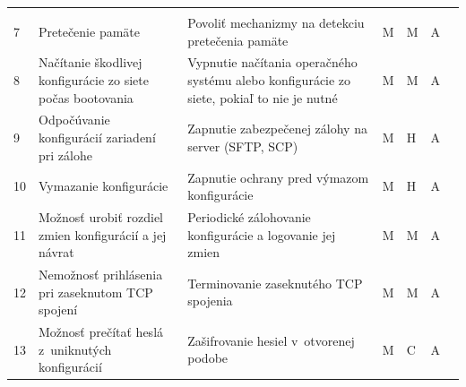 \begin{longtable}[!htbp]{|C{2.5em}L{11em}L{11em}C{2.5em}C{4em}C{5em}L{2.5em}|}
	\cite{CIS_DrTLsgXv24lxeIIM}\\
	 7	&Pretečenie pamäte	&Povoliť mechanizmy na detekciu pretečenia pamäte	&M	&M	&A	& \cite{Singh2018}\\
	8	&Načítanie škodlivej konfigurácie zo siete počas bootovania	&Vypnutie načítania operačného systému alebo konfigurácie zo siete, pokiaľ to nie je nutné	&M	&M	&A	& \cite{Akin2002}\\
	 9	&Odpočúvanie konfigurácií zariadení pri zálohe	&Zapnutie zabezpečenej zálohy na server (SFTP, SCP)	&M	&H	&A	& \cite{Singh2018}\\
	10	&Vymazanie konfigurácie	&Zapnutie ochrany pred výmazom konfigurácie	&M	&H	&A	& \cite{McMillan2018}\\
	 11	&Možnosť urobiť rozdiel zmien konfigurácií a jej návrat	&Periodické zálohovanie konfigurácie a logovanie jej zmien	&M	&M	&A	& \cite{McMillan2018}
	
	\cite{Singh2018}\\
	12	&Nemožnosť prihlásenia pri zaseknutom TCP spojení	&Terminovanie zaseknutého TCP spojenia	&M	&M	&A	& \cite{Singh2018}\\
	 13	&Možnosť prečítať heslá z~uniknutých konfigurácií	&Zašifrovanie hesiel v~otvorenej podobe	&M	&C	&A	& \cite{CIS_DrTLsgXv24lxeIIM}\\
	
	\hline
\end{longtable}%









\restoregeometry 
\normalsize

